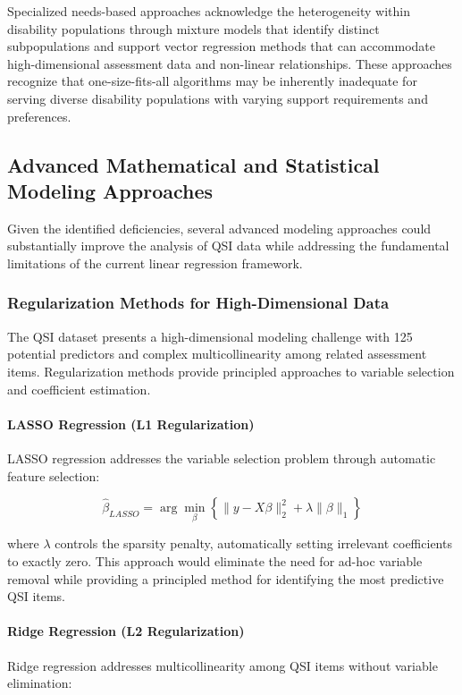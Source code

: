 Specialized needs-based approaches acknowledge the heterogeneity within disability populations through mixture models that identify distinct subpopulations and support vector regression methods that can accommodate high-dimensional assessment data and non-linear relationships. These approaches recognize that one-size-fits-all algorithms may be inherently inadequate for serving diverse disability populations with varying support requirements and preferences.

\subsection{Advanced Mathematical and Statistical Modeling Approaches}

Given the identified deficiencies, several advanced modeling approaches could substantially improve the analysis of QSI data while addressing the fundamental limitations of the current linear regression framework.

\subsubsection{Regularization Methods for High-Dimensional Data}

The QSI dataset presents a high-dimensional modeling challenge with 125 potential predictors and complex multicollinearity among related assessment items. Regularization methods provide principled approaches to variable selection and coefficient estimation.

\paragraph{LASSO Regression (L1 Regularization)}
LASSO regression addresses the variable selection problem through automatic feature selection:

\begin{equation}
\hat{\beta}_{LASSO} = \arg\min_{\beta} \left\{ \|y - X\beta\|_2^2 + \lambda\|\beta\|_1 \right\}
\end{equation}

where $\lambda$ controls the sparsity penalty, automatically setting irrelevant coefficients to exactly zero. This approach would eliminate the need for ad-hoc variable removal while providing a principled method for identifying the most predictive QSI items.

\paragraph{Ridge Regression (L2 Regularization)}
Ridge regression addresses multicollinearity among QSI items without variable elimination:

